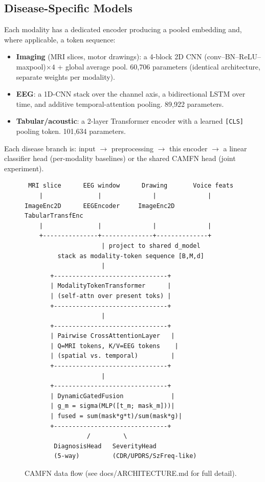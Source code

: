 \documentclass[conference]{IEEEtran}
\begin{document}
\subsection{Disease-Specific Models}
Each modality has a dedicated encoder producing a pooled embedding and,
where applicable, a token sequence:
\begin{itemize}
\item \textbf{Imaging} (MRI slices, motor drawings): a 4-block 2D CNN
(conv--BN--ReLU--maxpool)$\times4$ + global average pool. 60{,}706
parameters (identical architecture, separate weights per modality).
\item \textbf{EEG}: a 1D-CNN stack over the channel axis, a bidirectional
LSTM over time, and additive temporal-attention pooling. 89{,}922
parameters.
\item \textbf{Tabular/acoustic}: a 2-layer Transformer encoder with a
learned \texttt{[CLS]} pooling token. 101{,}634 parameters.
\end{itemize}
Each disease branch is: input $\rightarrow$ preprocessing $\rightarrow$
this encoder $\rightarrow$ a linear classifier head (per-modality
baselines) or the shared CAMFN head (joint experiment).

\begin{figure}[!t]
\centering
\footnotesize
\begin{verbatim}
 MRI slice      EEG window      Drawing       Voice feats
    |               |              |              |
ImageEnc2D      EEGEncoder     ImageEnc2D   TabularTransfEnc
    |               |              |              |
    +---------------+--------------+--------------+
                     | project to shared d_model
         stack as modality-token sequence [B,M,d]
                     |
       +-------------------------------+
       | ModalityTokenTransformer      |
       | (self-attn over present toks) |
       +-------------------------------+
                     |
       +-------------------------------+
       | Pairwise CrossAttentionLayer   |
       | Q=MRI tokens, K/V=EEG tokens    |
       | (spatial vs. temporal)         |
       +-------------------------------+
                     |
       +-------------------------------+
       | DynamicGatedFusion             |
       | g_m = sigma(MLP([t_m; mask_m]))|
       | fused = sum(mask*g*t)/sum(mask*g)|
       +-------------------------------+
                 /         \
        DiagnosisHead   SeverityHead
        (5-way)         (CDR/UPDRS/SzFreq-like)
\end{verbatim}
\caption{CAMFN data flow (see docs/ARCHITECTURE.md for full detail).}
\label{fig:flow}
\end{figure}
\end{document}
